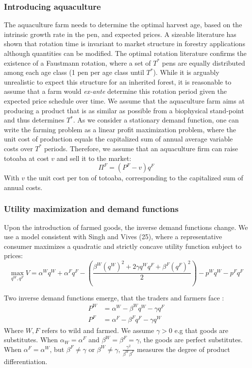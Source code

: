 \subsubsection{Introducing aquaculture}
\label{subsec:aquaculture}
The aquaculture farm needs to determine the optimal harvest age, based on the intrinsic growth rate in the pen, and expected prices. A sizeable literature has shown that rotation time is invariant to market structure in forestry applications \citep{faustmann1849, mitra_faustmann_1986} although quantities can be modified. The optimal rotation literature confirms the existence of a Faustmann rotation, where a set of $T^*$ pens are equally distributed among each age class (1 pen per age class until $T^*$). While it is arguably unrealistic to expect this structure for an inherited forest, it is reasonable to assume that a farm would \textit{ex-ante} determine this rotation period given the expected price schedule over time. We assume that the aquaculture farm aims at producing a product that is as similar as possible from a biophysical stand-point and thus determines $T^*$.
As we consider a stationary demand function, one can write the farming problem as a linear profit maximization problem, where the unit cost of production equals the capitalized sum of annual average variable costs over $T^*$ periods. 
Therefore, we assume that an aquaculture firm can raise totoaba at cost $v$ and sell it to the market: 
\begin{equation}
    \Pi^F = (P^F- v)q^F
    \label{eq:profit_aquaculture}
\end{equation}
With $v$ the unit cost per ton of totoaba, corresponding to the capitalized sum of annual costs. 

\subsubsection{Utility maximization and demand functions}
Upon the introduction of farmed goods, the inverse demand functions change. 
We use a model consistent with Singh and Vives (25), where a representative consumer maximizes  a quadratic and strictly concave utility function subject to prices: 
\begin{equation}
    \max_{q^W, q^F}V = \alpha^W q^W + \alpha^F q^F - \left(\frac{\beta^W (q^W)^2 + 2\gamma q^W q^F +\beta^F (q^F)^2}{2}\right) - p^Wq^W - p^Fq^F
\end{equation}

Two inverse demand functions emerge, that the traders and farmers face : 
\begin{align}
P^W &= \alpha^W- \beta^W q^W - \gamma q^F \label{eq:demand_wild}\\
P^F &= \alpha^F
 - \beta^F q^F - \gamma q^W \label{eq:demand_farmed}
\end{align}
Where $W, F$ refers to wild and farmed. We assume $\gamma>0$ e.g that goods are substitutes. When $\alpha_W = \alpha^F$ and $\beta^W = \beta^F = \gamma$, the goods are perfect substitutes. When $\alpha^F = \alpha^W$, but $\beta^F \neq \gamma$ or $\beta^W \neq \gamma$,  $\frac{\gamma^2}{\beta^W \beta^F}$ measures the degree of product differentiation. 


